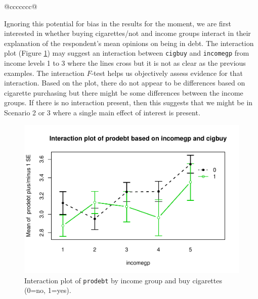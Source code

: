 \documentclass[]{book}
\newenvironment{Shaded}{\begin{snugshade}}{\end{snugshade}}
\newcommand{\KeywordTok}[1]{\textcolor[rgb]{0.13,0.29,0.53}{\textbf{#1}}}
\newcommand{\StringTok}[1]{\textcolor[rgb]{0.31,0.60,0.02}{#1}}
\newcommand{\OperatorTok}[1]{\textcolor[rgb]{0.81,0.36,0.00}{\textbf{#1}}}
\newcommand{\NormalTok}[1]{#1}
\theoremstyle{definition}
\theoremstyle{definition}
\theoremstyle{remark}
\begin{document}
\begin{longtable}[]{@{}ccccccc@{}}
\begin{minipage}[b]{0.10\columnwidth}
\begin{Shaded}
\begin{Highlighting}[]
\begin{Shaded}
\begin{Highlighting}[]
\begin{Shaded}
\begin{Highlighting}[]
Ignoring this potential for bias in the results for the moment, we are
first interested in whether buying cigarettes/not and income groups
interact in their explanation of the respondent's mean opinions on being
in debt. The interaction plot (Figure \ref{fig:Figure4-12}) may suggest
an interaction between \texttt{cigbuy} and \texttt{incomegp} from income
levels 1 to 3 where the lines cross but it is not as clear as the
previous examples. The interaction \(F\)-test helps us objectively
assess evidence for that interaction. Based on the plot, there do not
appear to be differences based on cigarette purchasing but there might
be some differences between the income groups. If there is no
interaction present, then this suggests that we might be in Scenario 2
or 3 where a single main effect of interest is present.

\begin{Shaded}
\end{Shaded}




\begin{figure}
\centering
\includegraphics{04-twoWayAnova_files/figure-latex/Figure4-12-1.pdf}
\caption{\label{fig:Figure4-12}Interaction plot of \texttt{prodebt} by income group and
buy cigarettes (0=no, 1=yes).}
\end{figure}


\end{Highlighting}
\end{Shaded}
\end{Highlighting}
\end{Shaded}
\end{Highlighting}
\end{Shaded}
\end{minipage}
\end{longtable}
\end{document}
